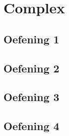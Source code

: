 \documentclass[a4paper,11pt]{report}
\begin{document}
\chapter{Complex}
\section{Oefening 1}

\section{Oefening 2}

\section{Oefening 3}

\section{Oefening 4}

\newpage
\end{document}
